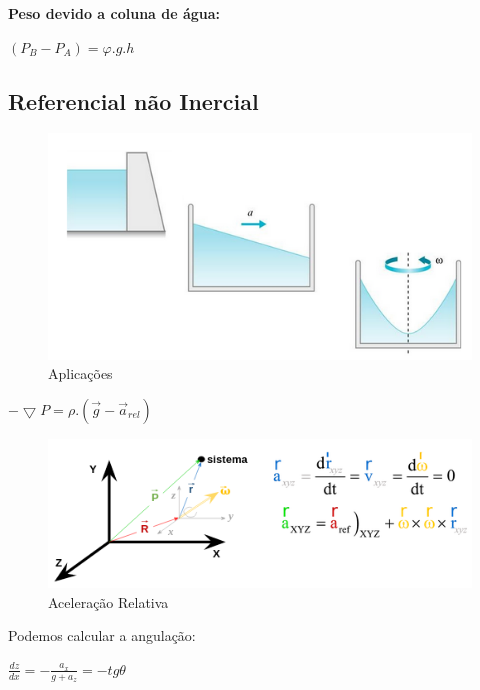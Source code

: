 \documentclass[a4paper, 12pt]{article}
\begin{document}
	\textbf{Peso devido a coluna de água:}
	\begin{center}
		\Large
		$
		(P_{B} - P_{A}) = \varphi .g.h
		$
	\end{center}
\subsection{Referencial não Inercial}
	\begin{figure}[h]
		\centering
		\includegraphics[width=0.7\linewidth]{imagens/aa}
		\caption[]{Aplicações}
		\label{fig:aa}
	\end{figure}
	
	\begin{center}
		\Large
		$
		- \bigtriangledown P = \rho.(\vec{g} - \vec{a}_{rel})
		$
	\end{center}
	\begin{figure}[h]
		\centering
		\includegraphics[width=0.7\linewidth]{imagens/aa1}
		\caption{Aceleração Relativa}
		\label{fig:aa1}
	\end{figure}
	Podemos calcular a angulação:
	\begin{center}
		\Large
		$
		\frac{dz}{dx} = - \frac{a_x}{g + a_z} = - tg \theta
		$
	\end{center}
\end{document}
